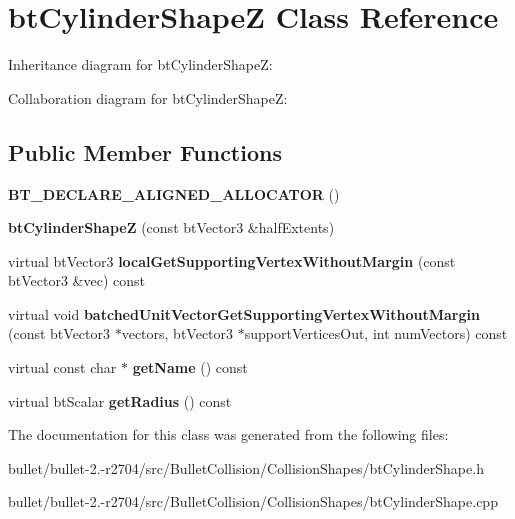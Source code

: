 \hypertarget{classbt_cylinder_shape_z}{\section{bt\+Cylinder\+Shape\+Z Class Reference}
\label{classbt_cylinder_shape_z}
}


Inheritance diagram for bt\+Cylinder\+Shape\+Z\+:


Collaboration diagram for bt\+Cylinder\+Shape\+Z\+:
\subsection*{Public Member Functions}
\begin{DoxyCompactItemize}
\item 
\hypertarget{classbt_cylinder_shape_z_a73e7d2fa2758c2ba0ca6534e6079cbbd}{{\bfseries B\+T\+\_\+\+D\+E\+C\+L\+A\+R\+E\+\_\+\+A\+L\+I\+G\+N\+E\+D\+\_\+\+A\+L\+L\+O\+C\+A\+T\+O\+R} ()}\label{classbt_cylinder_shape_z_a73e7d2fa2758c2ba0ca6534e6079cbbd}

\item 
\hypertarget{classbt_cylinder_shape_z_ac26fdfc5964453cb832946225ff9432a}{{\bfseries bt\+Cylinder\+Shape\+Z} (const bt\+Vector3 \&half\+Extents)}\label{classbt_cylinder_shape_z_ac26fdfc5964453cb832946225ff9432a}

\item 
\hypertarget{classbt_cylinder_shape_z_af6e1d37b1e1f8def6adc6ebc73325b06}{virtual bt\+Vector3 {\bfseries local\+Get\+Supporting\+Vertex\+Without\+Margin} (const bt\+Vector3 \&vec) const }\label{classbt_cylinder_shape_z_af6e1d37b1e1f8def6adc6ebc73325b06}

\item 
\hypertarget{classbt_cylinder_shape_z_a1eb36aa31eaa453e73f295429698ba24}{virtual void {\bfseries batched\+Unit\+Vector\+Get\+Supporting\+Vertex\+Without\+Margin} (const bt\+Vector3 $\ast$vectors, bt\+Vector3 $\ast$support\+Vertices\+Out, int num\+Vectors) const }\label{classbt_cylinder_shape_z_a1eb36aa31eaa453e73f295429698ba24}

\item 
\hypertarget{classbt_cylinder_shape_z_ad73796e8b1ff0f225dd118d45a3003db}{virtual const char $\ast$ {\bfseries get\+Name} () const }\label{classbt_cylinder_shape_z_ad73796e8b1ff0f225dd118d45a3003db}

\item 
\hypertarget{classbt_cylinder_shape_z_aa8e783969d06a108daefe92c4c239236}{virtual bt\+Scalar {\bfseries get\+Radius} () const }\label{classbt_cylinder_shape_z_aa8e783969d06a108daefe92c4c239236}

\end{DoxyCompactItemize}


The documentation for this class was generated from the following files\+:\begin{DoxyCompactItemize}
\item 
bullet/bullet-\/2.-\/r2704/src/\+Bullet\+Collision/\+Collision\+Shapes/bt\+Cylinder\+Shape.\+h\item 
bullet/bullet-\/2.-\/r2704/src/\+Bullet\+Collision/\+Collision\+Shapes/bt\+Cylinder\+Shape.\+cpp\end{DoxyCompactItemize}
